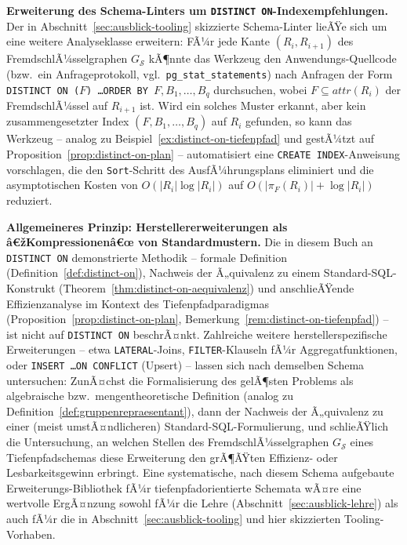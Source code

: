 ﻿\documentclass[a4paper,12pt]{report}
\theoremstyle{definition}
\theoremstyle{remark}
\newcommand{\att}{\mathit{attr}}
\begin{document}
\textbf{Erweiterung des Schema-Linters um \texttt{DISTINCT
ON}-Indexempfehlungen.}
Der in Abschnitt~\ref{sec:ausblick-tooling} skizzierte
Schema-Linter lieÃŸe sich um eine weitere Analyseklasse erweitern: FÃ¼r
jede Kante $(R_i,R_{i+1})$ des FremdschlÃ¼sselgraphen
$G_{\mathcal{S}}$ kÃ¶nnte das Werkzeug den Anwendungs-Quellcode (bzw.\
ein Anfrageprotokoll, vgl.\ \texttt{pg\_stat\_statements}) nach
Anfragen der Form
\texttt{DISTINCT ON (}$F$\texttt{) \ldots ORDER BY }$F,B_1,\ldots,B_q$
durchsuchen, wobei $F\subseteq\att(R_i)$ der FremdschlÃ¼ssel auf
$R_{i+1}$ ist. Wird ein solches Muster erkannt, aber kein
zusammengesetzter Index $(F,B_1,\ldots,B_q)$ auf $R_i$ gefunden, so
kann das Werkzeug -- analog zu
Beispiel~\ref{ex:distinct-on-tiefenpfad} und gestÃ¼tzt auf
Proposition~\ref{prop:distinct-on-plan} -- automatisiert eine
\texttt{CREATE INDEX}-Anweisung vorschlagen, die den
\texttt{Sort}-Schritt des AusfÃ¼hrungsplans eliminiert und die
asymptotischen Kosten von $O(|R_i|\log|R_i|)$ auf
$O(|\pi_{F}(R_i)|+\log|R_i|)$ reduziert.

\textbf{Allgemeineres Prinzip: Herstellererweiterungen als
â€žKompressionenâ€œ von Standardmustern.}
Die in diesem Buch an \texttt{DISTINCT ON} demonstrierte Methodik --
formale Definition (Definition~\ref{def:distinct-on}), Nachweis der
Ã„quivalenz zu einem Standard-SQL-Konstrukt
(Theorem~\ref{thm:distinct-on-aequivalenz}) und anschlieÃŸende
Effizienzanalyse im Kontext des Tiefenpfadparadigmas
(Proposition~\ref{prop:distinct-on-plan},
Bemerkung~\ref{rem:distinct-on-tiefenpfad}) -- ist nicht auf
\texttt{DISTINCT ON} beschrÃ¤nkt. Zahlreiche weitere
herstellerspezifische Erweiterungen -- etwa \texttt{LATERAL}-Joins,
\texttt{FILTER}-Klauseln fÃ¼r Aggregatfunktionen, oder
\texttt{INSERT \ldots ON CONFLICT} (\glqq Upsert\grqq{}) -- lassen
sich nach demselben Schema untersuchen: ZunÃ¤chst die Formalisierung
des gelÃ¶sten Problems als algebraische bzw.\
mengentheoretische Definition (analog zu
Definition~\ref{def:gruppenrepraesentant}), dann der Nachweis der
Ã„quivalenz zu einer (meist umstÃ¤ndlicheren) Standard-SQL-Formulierung,
und schlieÃŸlich die Untersuchung, an welchen Stellen des
FremdschlÃ¼sselgraphen $G_{\mathcal{S}}$ eines Tiefenpfadschemas diese
Erweiterung den grÃ¶ÃŸten Effizienz- oder Lesbarkeitsgewinn erbringt.
Eine systematische, nach diesem Schema aufgebaute
\glqq Erweiterungs-Bibliothek\grqq{} fÃ¼r tiefenpfadorientierte
Schemata wÃ¤re eine wertvolle ErgÃ¤nzung sowohl fÃ¼r die Lehre
(Abschnitt~\ref{sec:ausblick-lehre}) als auch fÃ¼r die in
Abschnitt~\ref{sec:ausblick-tooling} und hier skizzierten
Tooling-Vorhaben.
\end{document}
